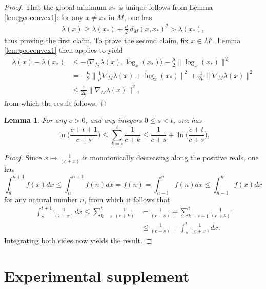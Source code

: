 \documentclass{article}
\theoremstyle{plain}
\newtheorem{lemma}[theorem]{Lemma}
\theoremstyle{definition}
\theoremstyle{remark}
\begin{document}
\begin{proof}
    That the global minimum $x_*$ is unique follows from Lemma \ref{lem:geoconvex1}: for any $x\neq x_*$ in $M$, one has
    \begin{align}
        \lambda(x)\geq \lambda(x_*) + \frac{\mu}{2}\,d_M(x,x_*)^2 >\lambda(x_*),
    \end{align}
    thus proving the first claim. To prove the second claim, fix $x\in M'$. Lemma \ref{lem:geoconvex1} then applies to yield
    \begin{align}
        \lambda(x)-\lambda(x_*)&\leq-\langle\nabla_M\lambda(x),\log_x(x_*)\rangle - \frac{\mu}{2}\|\log_x(x_*)\|^2\\&=-\frac{\mu}{2}\bigg\|\frac{1}{\mu}\nabla_M\lambda(x) + \log_x(x_*)\bigg\|^2 + \frac{1}{2\mu}\|\nabla_M\lambda(x)\|^2\\&\leq \frac{1}{2\mu}\|\nabla_M\lambda(x)\|^2,
    \end{align}
    from which the result follows.
\end{proof}


\begin{lemma}\label{lem:bounds}
    For any $c>0$, and any integers $0\leq s<t$, one has
    \begin{equation}
        \ln\bigg(\frac{c+t+1}{c+s}\bigg)\leq \sum_{k=s}^t\frac{1}{c+k}\leq\frac{1}{c+s}+\ln\bigg(\frac{c+t}{c+s}\bigg).
    \end{equation}
\end{lemma}

\begin{proof}
    Since $x\mapsto\frac{1}{(c+x)}$ is monotonically decreasing along the positive reals, one has
    \begin{equation}
        \int_{n}^{n+1}f(x)dx\leq\int_{n}^{n+1}f(n)dx= f(n) = \int_{n-1}^nf(n)dx\leq \int_{n-1}^nf(x)dx
    \end{equation}
    for any natural number $n$, from which it follows that
    \begin{align}
        \int_s^{t+1}\frac{1}{(c+x)}dx\leq \sum_{k=s}^t\frac{1}{(c+k)} &= \frac{1}{(c+s)}+\sum_{k=s+1}^t\frac{1}{(c+k)}\\&\leq \frac{1}{(c+s)}+\int_{s}^{t}\frac{1}{(c+x)}dx.
    \end{align}
    Integrating both sides now yields the result.
\end{proof}

\section{Experimental supplement}
\end{document}
